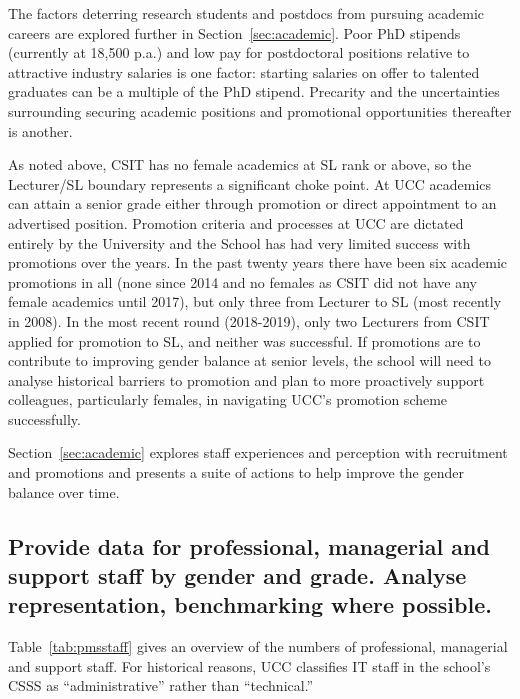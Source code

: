 The factors deterring research students and postdocs from pursuing 
academic careers are explored further in 
Section~\ref{sec:academic}. 
Poor PhD stipends (currently at \texteuro{}18,500 p.a.) and low
pay for postdoctoral positions relative to attractive industry salaries 
is one factor: starting salaries on offer to talented 
graduates can be a multiple of the PhD stipend. 
Precarity and the uncertainties surrounding  securing academic 
positions and promotional opportunities thereafter is another. 


As noted above, CSIT has no female academics at \ac{SL}
rank or above, so the Lecturer/SL boundary represents
a significant choke point.
At UCC academics can attain a senior grade 
either through promotion or direct appointment to an advertised 
position. Promotion criteria and processes at UCC are 
dictated entirely 
by the University and the School has had very limited success with 
promotions over the years.
In the past twenty years there have been six academic
promotions in all (none since 2014 and no females as CSIT did not have any female academics until 2017), 
but only three from Lecturer to 
SL (most recently in 2008).
In the most recent round (2018-2019), only two 
Lecturers from CSIT applied for promotion to SL, and neither was successful.  
If promotions are to contribute to improving gender balance at senior 
levels, the school will need to analyse historical barriers to promotion
and plan to more  proactively support colleagues, particularly
females, in navigating UCC's promotion scheme successfully. 

Section~\ref{sec:academic} explores staff experiences
and perception with recruitment and  promotions and presents a suite 
of actions to help improve the gender balance over 
time.


\subsection{Provide data for professional, managerial and support staff by gender and grade. Analyse representation, benchmarking where possible.}



Table~\ref{tab:pmsstaff} gives an overview of the numbers of professional,
managerial and support staff. For historical reasons, UCC classifies
IT staff in the school's \ac{CSSS} as 
``administrative'' rather than ``technical.''



